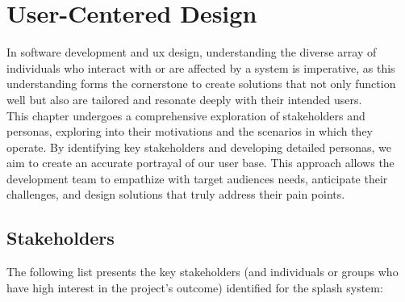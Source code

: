 \chapter{User-Centered Design}
\label{chapter:stakeholders_personas} 
In software development and \ac{ux} design, understanding the diverse array of individuals who interact with or are affected by a system is imperative, as this understanding forms the cornerstone to create solutions that not only function well but also are tailored and resonate deeply with their intended users. 
\\ 
This chapter undergoes a comprehensive exploration of stakeholders and personas, exploring into their motivations and the scenarios in which they operate. By identifying key stakeholders and developing detailed personas, we aim to create an accurate portrayal of our user base. This approach allows the development team to empathize with target audiences needs, anticipate their challenges, and design solutions that truly address their pain points. 
\\ 

\section{Stakeholders}
\label{section:stakeholders} 
The following list presents the key stakeholders (and individuals or groups who have high interest in the project’s outcome) identified for the \ac{splash} system: 

